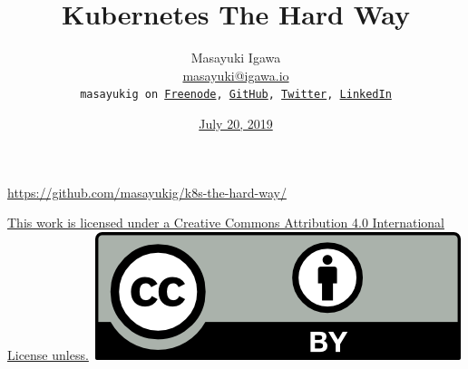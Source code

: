 \documentclass[aspectratio=169,11pt,hyperref={colorlinks=true}]{beamer}
\author[Masayuki Igawa]{%
    \texorpdfstring{%
            \centering
            Masayuki Igawa\\
            \href{mailto:masayuki@igawa.io}{masayuki@igawa.io}\\
            \texttt{masayukig on
              \href{https://freenode.net/}{Freenode},
              \href{https://github.com/masayukig}{GitHub},
              \href{https://twitter.com/masayukig}{Twitter},
              \href{https://www.linkedin.com/in/masayukig/}{LinkedIn}}
    }
    {Masayuki Igawa}
}
\date{\href{https://opensuseja.connpass.com/event/130049/}{July 20, 2019}}
\title[k8s-the-hard-way
  \hspace{4em}\insertframenumber/\inserttotalframenumber]{\Huge{Kubernetes The Hard Way}}
\begin{document}
{%
\begin{frame}[noframenumbering]
  \hypersetup{colorlinks,urlcolor=susedark}
  \titlepage{}
  \centering
  \@place \par
  \href{https://github.com/masayukig/k8s-the-hard-way/}{https://github.com/masayukig/k8s-the-hard-way/}
  \begin{flushright}
    \tiny\href{https://creativecommons.org/licenses/by/4.0/}{This work
      is licensed under a Creative Commons Attribution 4.0
      International License unless.}~\includegraphics[scale=0.3]{images/cc_by.png}
  \end{flushright}
\end{frame}
}
\end{document}
